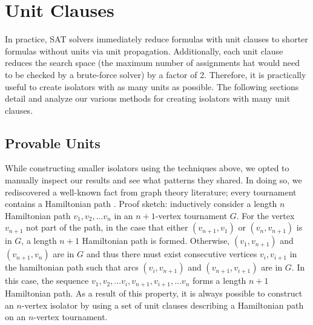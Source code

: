 \documentclass[conference]{IEEEtran}
\begin{document}









\section{Unit Clauses}

In practice, SAT solvers immediately reduce formulas with unit clauses to shorter formulas without units via unit propagation. Additionally, each unit clause reduces the search space (the maximum number of assignments hat would need to be checked by a brute-force solver) by a factor of 2. Therefore, it is practically useful to create isolators with as many units as possible. The following sections detail and analyze our various methods for creating isolators with many unit clauses.

\subsection{Provable Units}
While constructing smaller isolators using the techniques above, we opted to manually inspect our results and see what patterns they shared.  In doing so, we rediscovered a well-known fact from graph theory literature; every tournament contains a Hamiltonian path \cite{ref_tournament_book}. Proof sketch: inductively consider a length $n$ Hamiltonian path $v_1, v_2, ... v_n$ in an $n+1$-vertex tournament $G$. For the vertex $v_{n+1}$ not part of the path, in the case that either $(v_{n+1}, v_1)$ or $(v_n, v_{n+1})$ is in $G$, a length $n+1$ Hamiltonian path is formed. Otherwise, $(v_1, v_{n+1})$ and $(v_{n+1}, v_{n})$ are in $G$ and thus there must exist consecutive vertices $v_i,v_{i+1}$ in the hamiltonian path such that arcs $(v_i,v_{n+1})$ and $(v_{n+1},v_{i+1})$ are in $G$. In this case, the sequence $v_1,v_2,...v_i, v_{n+1}, v_{i+1},...v_n$ forms a length $n+1$ Hamiltonian path. As a result of this property, it is always possible to construct an $n$-vertex isolator by using a set of unit clauses describing a Hamiltonian path on an $n$-vertex tournament. 
\end{document}
